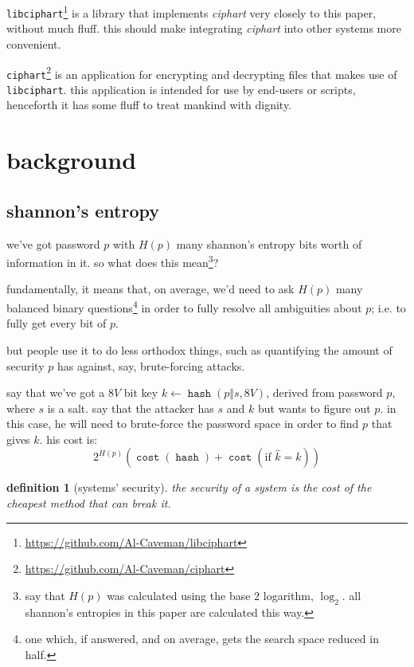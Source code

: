 \documentclass[twocolumn]{article}
\newtheorem{definition}{definition}
\DeclareMathOperator{\hash}{\mathtt{hash}}
\DeclareMathOperator{\cost}{\mathtt{cost}}
\begin{document}
\texttt{libciphart}\footnote{\url{https://github.com/Al-Caveman/libciphart}}
is a library that implements \emph{ciphart} very closely to this paper,
without much fluff.  this should make integrating \emph{ciphart} into other
systems more convenient.

\texttt{ciphart}\footnote{\url{https://github.com/Al-Caveman/ciphart}} is
an application for encrypting and decrypting files that makes use of
\texttt{libciphart}.  this application is intended for use by end-users or
scripts, henceforth it has some fluff to treat mankind with dignity.

\break
\tableofcontents

\section{background}
\subsection{shannon's entropy}
we've got password $p$ with $H(p)$ many shannon's entropy bits worth of
information in it.  so what does this mean\footnote{say that $H(p)$ was
calculated using the base $2$ logarithm, $\log_2$.  all shannon's entropies
in this paper are calculated this way.}?

fundamentally, it means that, on average, we'd need to ask $H(p)$ many
balanced binary questions\footnote{one which, if answered, and on average,
gets the search space reduced in half.} in order to fully resolve all
ambiguities about $p$; i.e.  to fully get every bit of $p$.

but people use it to do less orthodox things, such as quantifying the
amount of security $p$ has against, say, brute-forcing attacks.

say that we've got a $8V$ bit key $k \gets \hash(p \Vert s, 8V)$, derived
from password $p$, where $s$ is a salt.  say that the attacker has $s$ and
$k$ but wants to figure out $p$.  in this case, he will need to brute-force
the password space in order to find $p$ that gives $k$.  his cost is:
\begin{equation}\label{eq_cost_passbruteforce}
    2^{H(p)} \left(
        \cost(\hash) + \cost(\text{if } \hat k = k)
    \right)
\end{equation}

\begin{definition}[systems' security]
the security of a system is the cost of the cheapest method that can break
it.
\end{definition}
\end{document}

